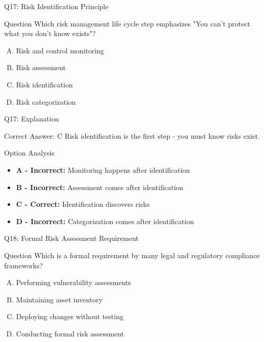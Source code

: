 \documentclass{beamer}
\begin{document}
	\begin{frame}{Q17: Risk Identification Principle}
		\begin{block}{Question}
			Which risk management life cycle step emphasizes "You can't protect what you don't know exists"?
		\end{block}
		\begin{enumerate}[(A)]
			\item Risk and control monitoring
			\item Risk assessment
			\item Risk identification
			\item Risk categorization
		\end{enumerate}
	\end{frame}
	
	\begin{frame}{Q17: Explanation}
		\begin{block}{Correct Answer: C}
			Risk identification is the first step - you must know risks exist.
		\end{block}
		\begin{block}{Option Analysis}
			\begin{itemize}
				\item \textbf{A - Incorrect:} Monitoring happens after identification
				\item \textbf{B - Incorrect:} Assessment comes after identification
				\item \textbf{C - Correct:} Identification discovers risks
				\item \textbf{D - Incorrect:} Categorization comes after identification
			\end{itemize}
		\end{block}
	\end{frame}
	
	\begin{frame}{Q18: Formal Risk Assessment Requirement}
		\begin{block}{Question}
			Which is a formal requirement by many legal and regulatory compliance frameworks?
		\end{block}
		\begin{enumerate}[(A)]
			\item Performing vulnerability assessments
			\item Maintaining asset inventory
			\item Deploying changes without testing
			\item Conducting formal risk assessment
		\end{enumerate}
	\end{frame}
	
\end{document}
